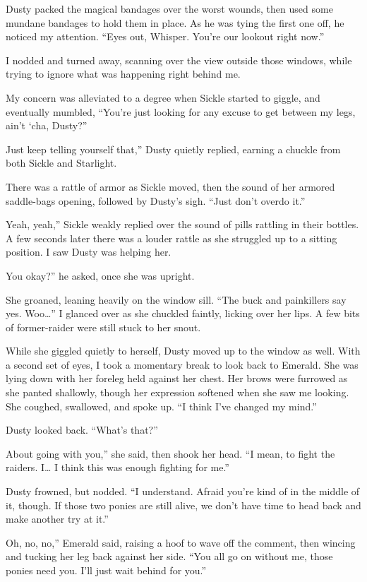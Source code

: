 Dusty packed the magical bandages over the worst wounds, then used some mundane bandages to hold them in place. As he was tying the first one off, he noticed my attention. “Eyes out, Whisper. You’re our lookout right now.”

I nodded and turned away, scanning over the view outside those windows, while trying to ignore what was happening right behind me.

My concern was alleviated to a degree when Sickle started to giggle, and eventually mumbled, “You’re just looking for any excuse to get between my legs, ain’t ‘cha, Dusty?”

\leavevmode{}Just keep telling yourself that,” Dusty quietly replied, earning a chuckle from both Sickle and Starlight.

There was a rattle of armor as Sickle moved, then the sound of her armored saddle-bags opening, followed by Dusty’s sigh. “Just don’t overdo it.”

\leavevmode{}Yeah, yeah,” Sickle weakly replied over the sound of pills rattling in their bottles. A few seconds later there was a louder rattle as she struggled up to a sitting position. I saw Dusty was helping her.

\leavevmode{}You okay?” he asked, once she was upright.

She groaned, leaning heavily on the window sill. “The buck and painkillers say yes. Woo…” I glanced over as she chuckled faintly, licking over her lips. A few bits of former-raider were still stuck to her snout.

While she giggled quietly to herself, Dusty moved up to the window as well. With a second set of eyes, I took a momentary break to look back to Emerald. She was lying down with her foreleg held against her chest. Her brows were furrowed as she panted shallowly, though her expression softened when she saw me looking. She coughed, swallowed, and spoke up. “I think I’ve changed my mind.”

Dusty looked back. “What’s that?”

\leavevmode{}About going with you,” she said, then shook her head. “I mean, to fight the raiders. I… I think this was enough fighting for me.”

Dusty frowned, but nodded. “I understand. Afraid you’re kind of in the middle of it, though. If those two ponies are still alive, we don’t have time to head back and make another try at it.”

\leavevmode{}Oh, no, no,” Emerald said, raising a hoof to wave off the comment, then wincing and tucking her leg back against her side. “You all go on without me, those ponies need you. I’ll just wait behind for you.”

